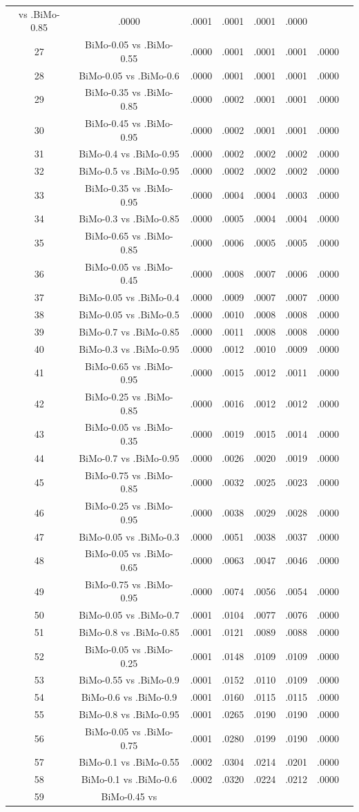 \documentclass[a4paper,10pt]{article}
\begin{document}
\begin{landscape}
\begin{table}[!htp]
\begin{tabular}{cccccccc}
vs .BiMo-0.85&.0000&.0001&.0001&.0001&.0000\\27&BiMo-0.05 vs .BiMo-0.55&.0000&.0001&.0001&.0001&.0000\\28&BiMo-0.05 vs .BiMo-0.6&.0000&.0001&.0001&.0001&.0000\\29&BiMo-0.35 vs .BiMo-0.85&.0000&.0002&.0001&.0001&.0000\\30&BiMo-0.45 vs .BiMo-0.95&.0000&.0002&.0001&.0001&.0000\\31&BiMo-0.4 vs .BiMo-0.95&.0000&.0002&.0002&.0002&.0000\\32&BiMo-0.5 vs .BiMo-0.95&.0000&.0002&.0002&.0002&.0000\\33&BiMo-0.35 vs .BiMo-0.95&.0000&.0004&.0004&.0003&.0000\\34&BiMo-0.3 vs .BiMo-0.85&.0000&.0005&.0004&.0004&.0000\\35&BiMo-0.65 vs .BiMo-0.85&.0000&.0006&.0005&.0005&.0000\\36&BiMo-0.05 vs .BiMo-0.45&.0000&.0008&.0007&.0006&.0000\\37&BiMo-0.05 vs .BiMo-0.4&.0000&.0009&.0007&.0007&.0000\\38&BiMo-0.05 vs .BiMo-0.5&.0000&.0010&.0008&.0008&.0000\\39&BiMo-0.7 vs .BiMo-0.85&.0000&.0011&.0008&.0008&.0000\\40&BiMo-0.3 vs .BiMo-0.95&.0000&.0012&.0010&.0009&.0000\\41&BiMo-0.65 vs .BiMo-0.95&.0000&.0015&.0012&.0011&.0000\\42&BiMo-0.25 vs .BiMo-0.85&.0000&.0016&.0012&.0012&.0000\\43&BiMo-0.05 vs .BiMo-0.35&.0000&.0019&.0015&.0014&.0000\\44&BiMo-0.7 vs .BiMo-0.95&.0000&.0026&.0020&.0019&.0000\\45&BiMo-0.75 vs .BiMo-0.85&.0000&.0032&.0025&.0023&.0000\\46&BiMo-0.25 vs .BiMo-0.95&.0000&.0038&.0029&.0028&.0000\\47&BiMo-0.05 vs .BiMo-0.3&.0000&.0051&.0038&.0037&.0000\\48&BiMo-0.05 vs .BiMo-0.65&.0000&.0063&.0047&.0046&.0000\\49&BiMo-0.75 vs .BiMo-0.95&.0000&.0074&.0056&.0054&.0000\\50&BiMo-0.05 vs .BiMo-0.7&.0001&.0104&.0077&.0076&.0000\\51&BiMo-0.8 vs .BiMo-0.85&.0001&.0121&.0089&.0088&.0000\\52&BiMo-0.05 vs .BiMo-0.25&.0001&.0148&.0109&.0109&.0000\\53&BiMo-0.55 vs .BiMo-0.9&.0001&.0152&.0110&.0109&.0000\\54&BiMo-0.6 vs .BiMo-0.9&.0001&.0160&.0115&.0115&.0000\\55&BiMo-0.8 vs .BiMo-0.95&.0001&.0265&.0190&.0190&.0000\\56&BiMo-0.05 vs .BiMo-0.75&.0001&.0280&.0199&.0190&.0000\\57&BiMo-0.1 vs .BiMo-0.55&.0002&.0304&.0214&.0201&.0000\\58&BiMo-0.1 vs .BiMo-0.6&.0002&.0320&.0224&.0212&.0000\\59&BiMo-0.45 vs 
\end{tabular}
\end{table}
\end{landscape}
\end{document}
